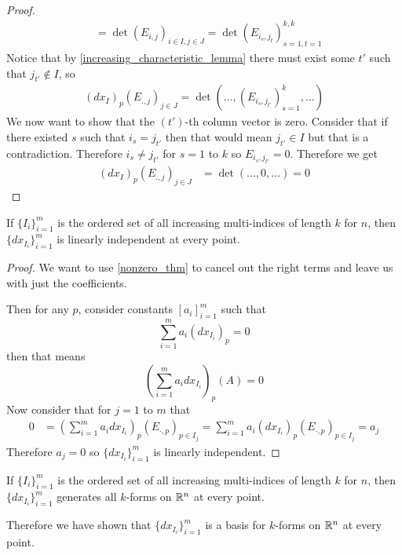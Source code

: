 \documentclass[notes]{subfiles}
\begin{document}
\begin{proof}
\begin{align*}
        &= \det(E_{i, j})_{i \in I, j \in J}
        = \det(E_{i_s, j_t})_{s = 1, t = 1}^{k, k}
    \end{align*}
    Notice that by \cref{increasing_characteristic_lemma} there must exist some $t'$ such that $j_{t'} \notin I$, so
    \begin{align*}
        (dx_I)_p(E_{., j})_{j \in J}
        = \det(\ldots, (E_{i_s, j_{t'}})_{s = 1}^k, \ldots)
    \end{align*}
    We now want to show that the $(t')$-th column vector is zero. Consider that if there existed $s$ such that $i_s = j_{t'}$ then that would mean $j_{t'} \in I$ but that is a contradiction. Therefore $i_s \neq j_{t'}$ for $s = 1$ to $k$ so $E_{i_s, j_{t'}} = 0$. Therefore we get
    \begin{align*}
        (dx_I)_p(E_{., j})_{j \in J}
        &= \det(\ldots, 0, \ldots)
        = 0
    \end{align*}
\end{proof}

\begin{lemma}
    If $\{I_i\}_{i = 1}^m$ is the ordered set of all increasing multi-indices of length $k$ for $n$, then $\{dx_{I_i}\}_{i = 1}^m$ is linearly independent at every point.
\end{lemma}
\begin{proof}
    We want to use \cref{nonzero_thm} to cancel out the right terms and leave us with just the coefficients.

    Then for any $p$, consider constants $[a_i]_{i = 1}^m$ such that
    \[
        \sum_{i = 1}^m a_i (dx_{I_i})_p = 0
    \]
    then that means
    \[
        \left(\sum_{i = 1}^m a_i dx_{I_i}\right)_p(A) = 0
    \]
    Now consider that for $j = 1$ to $m$ that
    \begin{align*}
        0
        &= \left(\sum_{i = 1}^m a_i dx_{I_i}\right)_p(E_{\cdot, p})_{p \in I_j} = \sum_{i = 1}^m a_i(dx_{I_i})_p(E_{\cdot, p})_{p \in I_j}
        = a_j
    \end{align*}
    Therefore $a_j = 0$ so $\{dx_{I_i}\}_{i = 1}^m$ is linearly independent.
\end{proof}

\begin{theorem}
    If $\{I_i\}_{i = 1}^m$ is the ordered set of all increasing multi-indices of length $k$ for $n$, then $\{dx_{I_i}\}_{i = 1}^m$ generates all $k$-forms on $\mathbb{R}^n$ at every point.
\end{theorem}


Therefore we have shown that $\{dx_{I_i}\}_{i = 1}^m$ is a basis for $k$-forms on $\mathbb{R}^n$ at every point.
\end{document}
